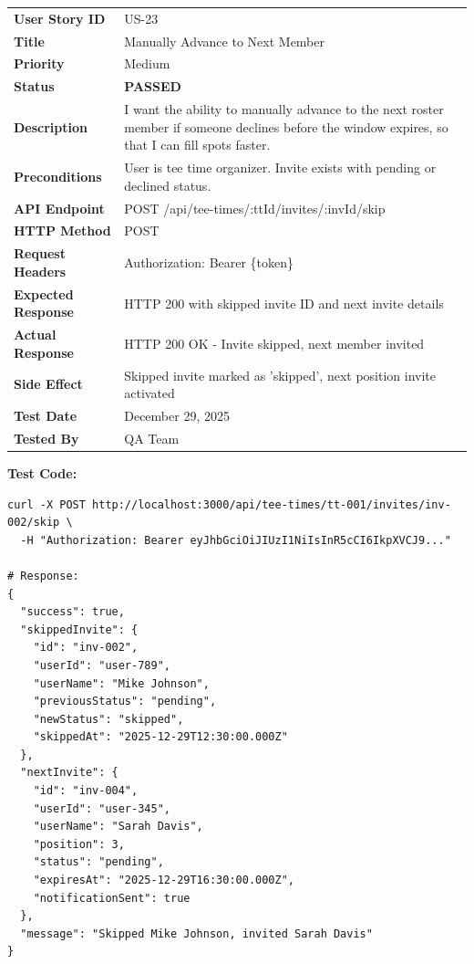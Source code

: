 \documentclass[11pt,a4paper]{article}
\newcommand{\passed}{\textcolor{pass}{\textbf{PASSED}}}
\begin{document}
\begin{tabularx}{\textwidth}{|p{3.2cm}|Y|}
\hline
{}
 \\
\hline
\textbf{User Story ID} & US-23 \\
\hline
\textbf{Title} & Manually Advance to Next Member \\
\hline
\textbf{Priority} & Medium \\
\hline
\textbf{Status} & \passed \\
\hline
\textbf{Description} & I want the ability to manually advance to the next roster member if someone declines before the window expires, so that I can fill spots faster. \\
\hline
\textbf{Preconditions} & User is tee time organizer. Invite exists with pending or declined status. \\
\hline
\textbf{API Endpoint} & POST /api/tee-times/:ttId/invites/:invId/skip \\
\hline
\textbf{HTTP Method} & POST \\
\hline
\textbf{Request Headers} & Authorization: Bearer \{token\} \\
\hline
\textbf{Expected Response} & HTTP 200 with skipped invite ID and next invite details \\
\hline
\textbf{Actual Response} & HTTP 200 OK - Invite skipped, next member invited \\
\hline
\textbf{Side Effect} & Skipped invite marked as 'skipped', next position invite activated \\
\hline
\textbf{Test Date} & December 29, 2025 \\
\hline
\textbf{Tested By} & QA Team \\
\hline
\end{tabularx}

\vspace{0.3cm}
\textbf{Test Code:}
\begin{lstlisting}
curl -X POST http://localhost:3000/api/tee-times/tt-001/invites/inv-002/skip \
  -H "Authorization: Bearer eyJhbGciOiJIUzI1NiIsInR5cCI6IkpXVCJ9..."

# Response:
{
  "success": true,
  "skippedInvite": {
    "id": "inv-002",
    "userId": "user-789",
    "userName": "Mike Johnson",
    "previousStatus": "pending",
    "newStatus": "skipped",
    "skippedAt": "2025-12-29T12:30:00.000Z"
  },
  "nextInvite": {
    "id": "inv-004",
    "userId": "user-345",
    "userName": "Sarah Davis",
    "position": 3,
    "status": "pending",
    "expiresAt": "2025-12-29T16:30:00.000Z",
    "notificationSent": true
  },
  "message": "Skipped Mike Johnson, invited Sarah Davis"
}
\end{lstlisting}
\end{document}

